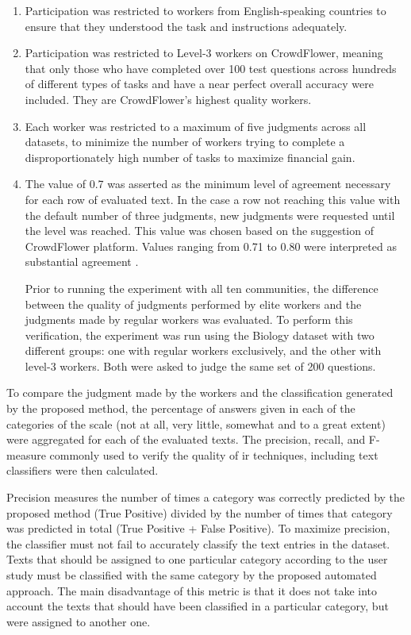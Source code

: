\begin{enumerate}

\item Participation was restricted to workers from English-speaking countries to ensure that they understood the task and instructions adequately. 

\item Participation was restricted to Level-3 workers on CrowdFlower, meaning that only those who have completed over 100 test questions across hundreds of different types of tasks and have a near perfect overall accuracy were included. They are CrowdFlower's highest quality workers.

\item Each worker was restricted to a maximum of five judgments across all datasets, to minimize the number of workers trying to complete a disproportionately high number of tasks to maximize financial gain.

\item The value of 0.7 was asserted as the minimum level of agreement necessary for each row of evaluated text. In the case a row not reaching this value with the default number of three judgments, new judgments were requested until the level was reached. This value was chosen based on the suggestion of CrowdFlower platform. Values ranging from 0.71 to 0.80 were interpreted as substantial agreement \cite{mchugh2012interrater}.

Prior to running the experiment with all ten communities, the difference between the quality of judgments performed by elite workers and the judgments made by regular workers was evaluated. To perform this verification, the experiment was run using the Biology dataset with two different groups: one with regular workers exclusively, and the other with level-3 workers. Both were asked to judge the same set of 200 questions. 

\end{enumerate}

To compare the judgment made by the workers and the classification generated by the proposed method, the percentage of answers given in each of the categories of the scale (not at all, very little, somewhat and to a great extent) were aggregated for each of the evaluated texts. The precision, recall, and F-measure commonly used to verify the quality of \gls{ir} techniques, including text classifiers \cite{makhoul1999performance} were then calculated.

Precision measures the number of times a category was correctly predicted by the proposed method (True Positive) divided by the number of times that category was predicted in total (True Positive + False Positive). To maximize precision, the classifier must not fail to accurately classify the text entries in the dataset. Texts that should be assigned to one particular category according to the user study must be classified with the same category by the proposed automated approach. The main disadvantage of this metric is that it does not take into account the texts that should have been classified in a particular category, but were assigned to another one.

